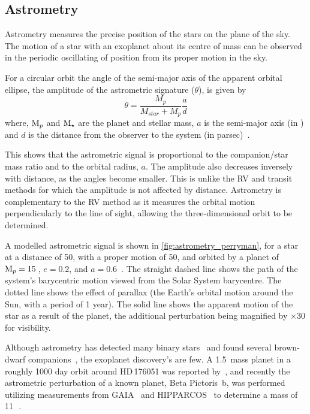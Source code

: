 \subsection{Astrometry}

\label{subsec:astrometry}
Astrometry measures the precise position of the stars on the plane of the sky.
The motion of a star with an exoplanet about its centre of mass can be observed in the periodic oscillating of position from its proper motion in the sky.

For a circular orbit the angle of the semi-major axis of the apparent orbital ellipse, the amplitude of the astrometric signature ($\theta$), is given by
\begin{equation}
\theta = \frac{M_{p}}{M_{star} + M_{p}} \frac{a}{d}
\end{equation}
where, $\textrm{M}_{p}$ and $\textrm{M}_{\star}$ are the planet and stellar mass, $a$ is the semi-major axis (in \AU) and $d$ is the distance from the observer to the system (in parsec)~\citep{perryman_exoplanet_2011}.

This shows that the astrometric signal is proportional to the companion/star mass ratio and to the orbital radius, $a$.
The amplitude also decreases inversely with distance, as the angles become smaller.
This is unlike the {RV} and transit methods for which the amplitude is not affected by distance.
Astrometry is complementary to the {RV} method as it measures the orbital motion perpendicularly to the line of sight, allowing the three-dimensional orbit to be determined.

A modelled astrometric signal is shown in \cref{fig:astrometry_perryman}, for a star at a distance of 50\pc, with a proper motion of 50\masperyr{}, and orbited by a planet of $\textrm{M}_{p} = 15$\,\Mjup{}, $e = 0.2$, and $a = 0.6$\AU~\citep{perryman_extrasolar_2000}.
The straight dashed line shows the path of the system's barycentric motion viewed from the Solar System barycentre.
The dotted line shows the effect of parallax (the Earth's orbital motion around the Sun, with a period of 1 year).
The solid line shows the apparent motion of the star as a result of the planet, the additional perturbation being magnified by $\times 30$ for visibility.

Although astrometry has detected many binary stars~\citep[e.g.][]{gontcharov_new_2000} and found several brown-dwarf companions~\citep[e.g.][]{sahlmann_search_2011}, the exoplanet discovery's are few.
A 1.5\,\Mjup{} mass planet in a roughly 1000 day orbit around {HD\,176051} was reported by~\citet{muterspaugh_phases_2010}, and recently the astrometric perturbation of a known planet, {Beta Pictoris~b}, was performed utilizing measurements from {GAIA}~\citep{collaboration_gaia_2016a} and {HIPPARCOS}~\citep{esa_hipparcos_1997} to determine a mass of 11\,\Mjup~\citep{snellen_mass_2018}.

